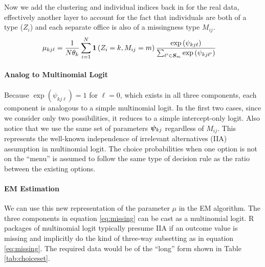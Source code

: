 \documentclass[11pt]{article}
\begin{document}
Now we add the clustering and individual indices back in for the real data, effectively another layer to account for the fact that individuals are both of a type (\(Z_i\)) and each separate office is also of a missingness type \(M_{ij}\). 
\begin{align}
\mu_{kj\ell} &= \frac{1}{N\theta_k}\sum^N_{i = 1}\bm{1}\left(Z_i = k, M_{ij}= m\right)\frac{\exp{(\psi_{kj\ell})}}{\sum_{\ell^\prime \in \bm{S}_{m}}\exp{(\psi_{kj\ell^\prime})}}\label{eq:missing}
\end{align}







\paragraph{Analog to Multinomial Logit} Because \(\exp(\psi_{kj\ell}) = 1\) for \(\ell = 0\), which exists in all three components, each component is analogous to a simple multinomial logit. In the first two cases, since we consider only two possibilities, it reduces to a simple intercept-only logit. Also notice that we use the same set of parameters \(\bm{\psi}_{kj}\) regardless of \(M_{ij}\). This represents the well-known independence of irrelevant alternatives (IIA) assumption in multinomial logit. The choice probabilities when one option is not on the ``menu'' is assumed to follow the same type of decision rule as the ratio between the existing options.  

\paragraph{EM Estimation} We can use this new representation of the parameter \(\mu\) in the EM algorithm. The three components in equation \ref{eq:missing} can be cast as a multinomial logit. R packages of multinomial logit typically presume IIA if an outcome value is missing and implicitly do the kind of three-way subsetting as in equation \ref{eq:missing}. The required data would be of the ``long'' form shown in Table \ref{tab:choiceset}.
\end{document}
